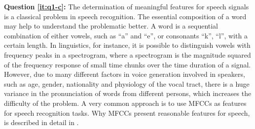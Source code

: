 \textbf{Question \ref{it:q1-c}:} 
The determination of meaningful features for speech signals is a classical problem in speech recognition.
The essential composition of a word may help to understand the problematic better.
A word is a sequential combination of either vowels, such as \enquote{a} and \enquote{e}, or consonants \enquote{k}, \enquote{l}, with a certain length. 
In linguistics, for instance, it is possible to distinguish vowels with frequency peaks in a spectrogram, where a spectrogram is the magnitude squared of the frequency response of small time chunks over the time duration of a signal.
However, due to many different factors in voice generation involved in speakers, such as age, gender, nationality and physiology of the vocal tract, there is a huge variance in the pronunciation of words from different persons, which increases the difficulty of the problem.
A very common approach is to use MFCCs as features for speech recognition tasks.
Why MFCCs present reasonable features for speech, is described in detail in .



